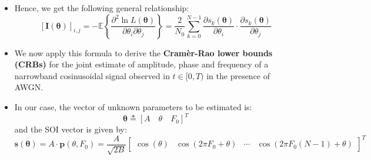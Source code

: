 \begin{itemize}
\[
\text{where} \quad \boldsymbol{\theta} \triangleq
\begin{bmatrix}
    \theta_1 & \theta_2 & \cdots & \theta_P
\end{bmatrix}^T
\]

\[
\ln L(\boldsymbol{\theta}) = -\frac{N}{2}\ln(\pi N_0)
- \frac{1}{N_0} \sum_{k=0}^{N-1} (x_k - s_k(\boldsymbol{\theta}))^2
\]

\[
\frac{\partial \ln L(\boldsymbol{\theta})}{\partial \theta_i}
= \frac{2}{N_0} \sum_{k=0}^{N-1} \frac{\partial s_k(\boldsymbol{\theta})}{\partial \theta_i}
(x_k - s_k(\boldsymbol{\theta}))
\]

\[
\frac{\partial^2 \ln L(\boldsymbol{\theta})}{\partial \theta_i \partial \theta_j}
= -\frac{2}{N_0}
\sum_{k=0}^{N-1} \frac{\partial s_k(\boldsymbol{\theta})}{\partial \theta_i}
\frac{\partial s_k(\boldsymbol{\theta})}{\partial \theta_j}
+
\frac{2}{N_0}
\sum_{k=0}^{N-1} 
\frac{\partial^2 s_k(\boldsymbol{\theta})}{\partial \theta_i \partial \theta_j}
(x_k - s_k(\boldsymbol{\theta}))
\]
\[
\text{since} \quad x_k \in \mathcal{N}\left(s_k(\boldsymbol{\theta}), \frac{N_0}{2}\right)
\implies
\mathbb{E}\left\{ x_k - s_k(\boldsymbol{\theta}) \right\} = 0
\]
    \item Hence, we get the following general relationship:
\[
\left[ \mathbf{I}(\boldsymbol{\theta}) \right]_{i,j}
= -\mathbb{E}\left\{
    \frac{\partial^2 \ln L(\boldsymbol{\theta})}{\partial \theta_i \partial \theta_j}
\right\}
= \frac{2}{N_0} \sum_{k=0}^{N-1}
    \frac{\partial s_k(\boldsymbol{\theta})}{\partial \theta_i}
    \cdot
    \frac{\partial s_k(\boldsymbol{\theta})}{\partial \theta_j}
\]
    \item We now apply this formula to derive the \textbf{Cramèr-Rao lower bounds (CRBs)} for the joint estimate of amplitude, phase and frequency of a narrowband cosinusoidal signal observed in \(t\in[0,T)\) in the presence of AWGN.
    \item In our case, the vector of unknown parameters to be estimated is:
    \[
    \boldsymbol{\theta}\triangleq[A\quad\theta\quad F_0]^T
    \]
    and the SOI vector is given by:
\[
\mathbf{s}(\boldsymbol{\theta}) = A \cdot \mathbf{p}(\theta, F_0) = \frac{A}{\sqrt{2B}}
\begin{bmatrix}
\cos(\theta) & \cos(2\pi F_0 + \theta) & \cdots & \cos\left(2\pi F_0 (N-1) + \theta\right)
\end{bmatrix}^{T}
\]


\end{itemize}
